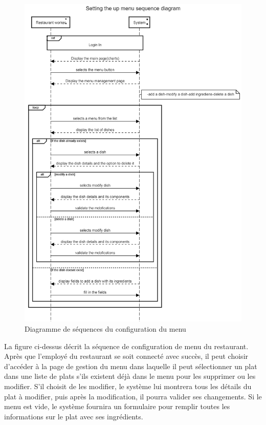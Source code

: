 \documentclass[french, a4paper, 12pt]{report}
\begin{document}
			\newpage	
			\begin{figure}[!h]
  				\center
  				\includegraphics[width=12cm]{seqmenu.png}
  				\caption{Diagramme de séquences du configuration du menu}
  				\label{fig:seqmenu}
			\end{figure} La figure ci-dessus décrit la séquence de configuration de menu du restaurant. Après que l'employé du restaurant se soit connecté avec succès, il peut choisir d'accéder à la page de gestion du menu dans laquelle il peut sélectionner un plat dans une liste de plats s'ils existent déjà dans le menu pour les supprimer ou les modifier. S'il choisit de les modifier, le système lui montrera tous les détails du plat à modifier, puis après la modification, il pourra valider ses changements. Si le menu est vide, le système fournira un formulaire pour remplir toutes les informations sur le plat avec ses ingrédients.
			
\end{document}
